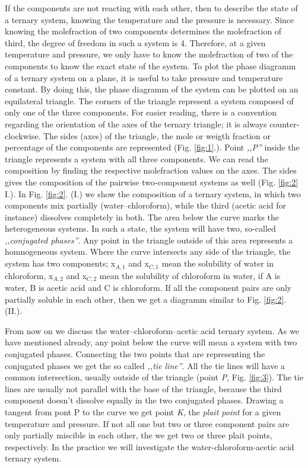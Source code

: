 If the components are not reacting with each other, then to describe the state of a ternary system, knowing the temperature and the pressure is necessary. Since knowing the molefraction of two components determines the molefraction of third, the degree of freedom in such a system is 4. Therefore, at a given temperature and pressure, we only have to know the molefraction of two of the components to know the exact state of the system. To plot the phase diagramm of a ternary system on a plane, it is useful to take pressure and temperature constant. By doing this, the phase diagramm of the system can be plotted on an equilateral triangle. The corners of the triangle represent a system composed of only one of the three components. For easier reading, there is a convention regarding the orientation of the axes of the ternary triangle; it is always counter-clockwise. The sides (axes) of the triangle, the mole or weigth fraction or percentage of the components are represented (Fig. \ref{fig:1}.). Point \emph{,,P''} inside the triangle represents a system with all three components. We can read the composition by finding the respective molefraction values on the axes. The sides gives the composition of the pairwise two-component systems as well (Fig. \ref{fig:2} I.). In Fig. \ref{fig:2}. (I.) we show the composition of a ternary system, in which two components mix partially (water--chloroform), while the third (acetic acid for instance) dissolves completely in both. The area below the curve marks the heterogeneous systems. In such a state, the system will have two, so-called \emph{,,conjugated phases''}. Any point in the triangle outside of this area represents a homnogeneous system. Where the curve intersects any side of the triangle, the system has two components; x$_{A,1}$ and x$_{C,1}$ mean the solubility of water in chloroform, x$_{A,2}$ and x$_{C,2}$ mean the solubility of chloroform in water, if A is water, B is acetic acid and C is chloroform. If all the component pairs are only partially soluble in each other, then we get a diagramm similar to Fig. \ref{fig:2}. (II.).

From now on we discuss the water--chloroform--acetic acid ternary system. As we have mentioned already, any point below the curve will mean a system with two conjugated phases. Connecting the two points that are representing the conjugated phases we get the so called \emph{,,tie line''}. All the tie lines will have a common intersection, usually outside of the triangle (point \emph{P}, Fig. \ref{fig:3}). The tie lines are usually not parallel with the base of the triangle, because the third component doesn't dissolve equally in the two conjugated phases. Drawing a tangent from pont P to the curve we get point \emph{K}, the \emph{plait point} for a given temperature and pressure. If not all one but two or three component pairs are only partially miscible in each other, the we get two or three plait points, respectively. In the practice we will investigate the water-chloroform-acetic acid ternary system. 

